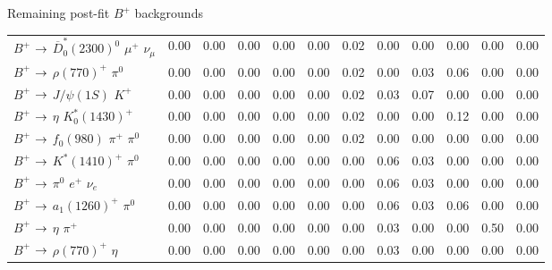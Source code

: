 \documentclass[xcolor=dvipsnames]{beamer}
\begin{document}
\begin{frame}{Remaining post-fit $B^+$ backgrounds}
{\begin{tabular}{lrrrrrrrrrrr}
      $B^{+}$ $\rightarrow$ $\overline{D}_{0}^{*}(2300)^{0}$ $\mu^{+}$ $\nu_{\mu}$ &         0.00 &         0.00 &         0.00 &         0.00 &         0.00 &         0.02 &         0.00 &         0.00 &         0.00 &         0.00 &         0.00 \\
      $B^{+}$ $\rightarrow$ $\rho(770)^{+}$ $\pi^{0}$                              &         0.00 &         0.00 &         0.00 &         0.00 &         0.00 &         0.02 &         0.00 &         0.03 &         0.06 &         0.00 &         0.00 \\
      $B^{+}$ $\rightarrow$ $J/\psi(1S)$ $K^{+}$                                   &         0.00 &         0.00 &         0.00 &         0.00 &         0.00 &         0.02 &         0.03 &         0.07 &         0.00 &         0.00 &         0.00 \\
      $B^{+}$ $\rightarrow$ $\eta$ $K_{0}^{*}(1430)^{+}$                           &         0.00 &         0.00 &         0.00 &         0.00 &         0.00 &         0.02 &         0.00 &         0.00 &         0.12 &         0.00 &         0.00 \\
      $B^{+}$ $\rightarrow$ $f_{0}(980)$ $\pi^{+}$ $\pi^{0}$                       &         0.00 &         0.00 &         0.00 &         0.00 &         0.00 &         0.02 &         0.00 &         0.00 &         0.00 &         0.00 &         0.00 \\
      $B^{+}$ $\rightarrow$ $K^{*}(1410)^{+}$ $\pi^{0}$                            &         0.00 &         0.00 &         0.00 &         0.00 &         0.00 &         0.00 &         0.06 &         0.03 &         0.00 &         0.00 &         0.00 \\
      $B^{+}$ $\rightarrow$ $\pi^{0}$ $e^{+}$ $\nu_{e}$                            &         0.00 &         0.00 &         0.00 &         0.00 &         0.00 &         0.00 &         0.06 &         0.03 &         0.00 &         0.00 &         0.00 \\
      $B^{+}$ $\rightarrow$ $a_{1}(1260)^{+}$ $\pi^{0}$                            &         0.00 &         0.00 &         0.00 &         0.00 &         0.00 &         0.00 &         0.06 &         0.03 &         0.06 &         0.00 &         0.00 \\
      $B^{+}$ $\rightarrow$ $\eta$ $\pi^{+}$                                       &         0.00 &         0.00 &         0.00 &         0.00 &         0.00 &         0.00 &         0.03 &         0.00 &         0.00 &         0.50 &         0.00 \\
      $B^{+}$ $\rightarrow$ $\rho(770)^{+}$ $\eta$                                 &         0.00 &         0.00 &         0.00 &         0.00 &         0.00 &         0.00 &         0.03 &         0.00 &         0.00 &         0.00 &         0.00 \\

\end{tabular}}
\end{frame}
\end{document}
